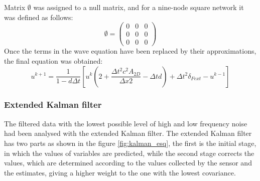 \documentclass[12pt, a4paper]{article} %
\begin{document}
Matrix $\emptyset$ was assigned to a null matrix, and for a nine-node square network it was defined as follows:
\begin{equation} \label{eqn:matrixI}
    \emptyset = 
        \begin{pmatrix}
            0 & 0 & 0\\
            0 & 0 & 0\\
            0 & 0 & 0
    \end{pmatrix}
\end{equation}
Once the terms in the wave equation have been replaced by their approximations, the final equation was obtained:
\begin{equation} \label{eqn:uk+1}
   u^{k + 1} = \frac{1}{1 - d\Delta t} \left[u^{k} \left(2+ \frac{\Delta t^{2} c^{2} A_{2D}}{\Delta x{2}} - \Delta t d\right) + \Delta t^{2} \delta_{Fext} - u^{k - 1}\right]
\end{equation}
\setlength{\parskip}{0mm}
\subsubsection{Extended Kalman filter}

The filtered data with the lowest possible level of high and low frequency noise had been analysed with the extended Kalman filter. The extended Kalman filter has two parts as shown in the figure \ref{fig:kalman_esq}, the first is the initial stage, in which the values of variables are predicted, while the second stage corrects the values, which are determined according to the values collected by the sensor and the estimates, giving a higher weight to the one with the lowest covariance. 
\end{document}
